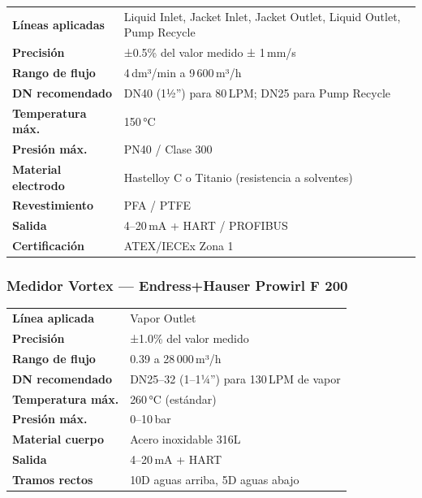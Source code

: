 \documentclass[12pt,letterpaper]{article}
\begin{document}
\begin{especbox}[title={FT (Líquidos) — E+H Promag P 300}]
\renewcommand{\arraystretch}{1.25}
\begin{tabular}{L{4.5cm} L{9cm}}
\textbf{Líneas aplicadas}   & Liquid Inlet, Jacket Inlet, Jacket Outlet, Liquid Outlet, Pump Recycle \\
\textbf{Precisión}          & ±0.5\% del valor medido ± 1\,mm/s \\
\textbf{Rango de flujo}     & 4\,dm³/min a 9\,600\,m³/h \\
\textbf{DN recomendado}     & DN40 (1½'') para 80\,LPM; DN25 para Pump Recycle \\
\textbf{Temperatura máx.}   & 150\,°C \\
\textbf{Presión máx.}       & PN40 / Clase 300 \\
\textbf{Material electrodo} & Hastelloy C o Titanio (resistencia a solventes) \\
\textbf{Revestimiento}      & PFA / PTFE \\
\textbf{Salida}             & 4--20\,mA + HART / PROFIBUS \\
\textbf{Certificación}      & ATEX/IECEx Zona 1 \\
\end{tabular}
\end{especbox}

\subsubsection{Medidor Vortex — Endress+Hauser Prowirl F 200}

\begin{especbox}[title={FT (Vapor) — E+H Prowirl F 200}]
\renewcommand{\arraystretch}{1.25}
\begin{tabular}{L{4.5cm} L{9cm}}
\textbf{Línea aplicada}   & Vapor Outlet \\
\textbf{Precisión}        & ±1.0\% del valor medido \\
\textbf{Rango de flujo}   & 0.39 a 28\,000\,m³/h \\
\textbf{DN recomendado}   & DN25--32 (1--1¼'') para 130\,LPM de vapor \\
\textbf{Temperatura máx.} & 260\,°C (estándar) \\
\textbf{Presión máx.}     & 0--10\,bar \\
\textbf{Material cuerpo}  & Acero inoxidable 316L \\
\textbf{Salida}           & 4--20\,mA + HART \\
\textbf{Tramos rectos}    & 10D aguas arriba, 5D aguas abajo \\
\end{tabular}
\end{especbox}
\end{document}
